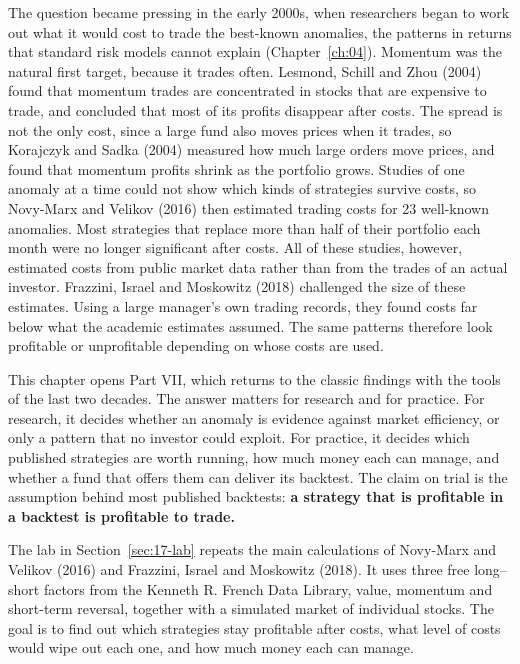 The question became pressing in the early 2000s, when researchers began to work out what it would cost to trade the best-known anomalies, the patterns in returns that standard risk models cannot explain (Chapter~\ref{ch:04}). Momentum was the natural first target, because it trades often. Lesmond, Schill and Zhou (2004) found that momentum trades are concentrated in stocks that are expensive to trade, and concluded that most of its profits disappear after costs. The spread is not the only cost, since a large fund also moves prices when it trades, so Korajczyk and Sadka (2004) measured how much large orders move prices, and found that momentum profits shrink as the portfolio grows. Studies of one anomaly at a time could not show which kinds of strategies survive costs, so Novy-Marx and Velikov (2016) then estimated trading costs for 23 well-known anomalies. Most strategies that replace more than half of their portfolio each month were no longer significant after costs. All of these studies, however, estimated costs from public market data rather than from the trades of an actual investor. Frazzini, Israel and Moskowitz (2018) challenged the size of these estimates. Using a large manager's own trading records, they found costs far below what the academic estimates assumed. The same patterns therefore look profitable or unprofitable depending on whose costs are used.

This chapter opens Part VII, which returns to the classic findings with the tools of the last two decades. The answer matters for research and for practice. For research, it decides whether an anomaly is evidence against market efficiency, or only a pattern that no investor could exploit. For practice, it decides which published strategies are worth running, how much money each can manage, and whether a fund that offers them can deliver its backtest. The claim on trial is the assumption behind most published backtests: \textbf{a strategy that is profitable in a backtest is profitable to trade.}

The lab in Section~\ref{sec:17-lab} repeats the main calculations of Novy-Marx and Velikov (2016) and Frazzini, Israel and Moskowitz (2018). It uses three free long--short factors from the Kenneth R. French Data Library, value, momentum and short-term reversal, together with a simulated market of individual stocks. The goal is to find out which strategies stay profitable after costs, what level of costs would wipe out each one, and how much money each can manage.

